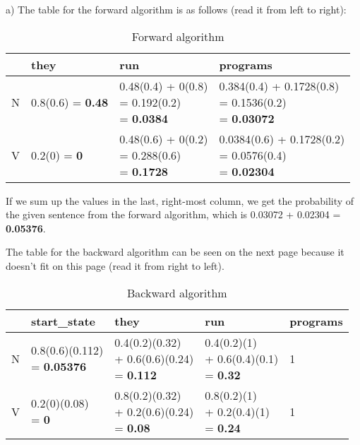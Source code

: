 \begin{solution}
a) The table for the forward algorithm is as follows (read it from left to right):

\begin{table}[h!]
	\centering
	\begin{tabular}{|l|l|l|l|}
		\hline
		& they            & run                                      & programs                                          \\ \hline
		N & 0.8(0.6) = \textbf{0.48} & \shortstack{0.48(0.4) + 0(0.8)\\= 0.192(0.2)\\= \textbf{0.0384}} & \shortstack{0.384(0.4) + 0.1728(0.8)\\= 0.1536(0.2) \\= \textbf{0.03072}}  \\ \hline
		V & 0.2(0) = \textbf{0}      & \shortstack{0.48(0.6) + 0(0.2) \\= 0.288(0.6) \\= \textbf{0.1728}} & \shortstack{0.0384(0.6) + 0.1728(0.2) \\= 0.0576(0.4) \\= \textbf{0.02304}} \\ \hline
	\end{tabular}
	\caption{Forward algorithm}
\end{table}

If we sum up the values in the last, right-most column, we get the probability of the given sentence from the forward algorithm, which is 0.03072 + 0.02304 = \textbf{0.05376}.

The table for the backward algorithm can be seen on the next page because it doesn't fit on this page (read it from right to left).

\begin{table}[!h]
	\centering
	\begin{tabular}{|l|l|l|l|l|}
		\hline
		& start\_state                     & they                                    & run                                & programs \\ \hline
		N & \shortstack{0.8(0.6)(0.112) \\= \textbf{0.05376}} & \shortstack{0.4(0.2)(0.32) \\+ 0.6(0.6)(0.24) \\= \textbf{0.112}} & \shortstack{0.4(0.2)(1) \\+ 0.6(0.4)(0.1) \\= \textbf{0.32}} & 1        \\ \hline
		V & \shortstack{0.2(0)(0.08) \\= \textbf{0}}          & \shortstack{0.8(0.2)(0.32) \\+ 0.2(0.6)(0.24) \\= \textbf{0.08}}  & \shortstack{0.8(0.2)(1) \\+ 0.2(0.4)(1) \\= \textbf{0.24}}   & 1        \\ \hline
	\end{tabular}
	\caption{Backward algorithm}
\end{table}


\end{solution}
